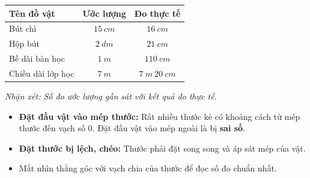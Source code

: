 \documentclass[10pt,a4paper]{article}
\begin{document}
\vspace{-1.5mm}
\noindent
\begin{minipage}[t]{0.49\textwidth}\vspace{0pt}
\begin{tcolorbox}[
  enhanced,
  colback=green!4!white,
  colframe=green!60!black,
  arc=2mm, boxrule=0.8pt,
  left=2mm, right=2mm, top=1.8mm, bottom=1.8mm,
  title={\footnotesize\bfseries\color{white}\faCheckCircle\ 4. Bảng ghi chép thực hành mẫu}
]
{\footnotesize
\begin{tabular}{|l|c|c|}
  \hline
  \textbf{Tên đồ vật} & \textbf{Ước lượng} & \textbf{Đo thực tế} \\
  \hline
  Bút chì & $15\ cm$ & $16\ cm$ \\
  Hộp bút & $2\ dm$ & $21\ cm$ \\
  Bề dài bàn học & $1\ m$ & $110\ cm$ \\
  Chiều dài lớp học & $7\ m$ & $7\ m\ 20\ cm$ \\
  \hline
\end{tabular}
\vspace{1mm}
\textit{Nhận xét: Số đo ước lượng gần sát với kết quả đo thực tế.}
}
\end{tcolorbox}
\end{minipage}
\hfill
\begin{minipage}[t]{0.49\textwidth}\vspace{0pt}
\begin{tcolorbox}[
  enhanced,
  colback=rose!4!white,
  colframe=rose!70!black,
  arc=2mm, boxrule=0.8pt,
  left=2mm, right=2mm, top=1.8mm, bottom=1.8mm,
  title={\footnotesize\bfseries\color{white}\faExclamationTriangle\ 5. Lỗi đo lường thường gặp}
]
{\footnotesize
\begin{itemize}\setlength{\itemsep}{1.5pt}\setlength{\leftskip}{-2.5mm}
  \item \textbf{Đặt đầu vật vào mép thước:} Rất nhiều thước kẻ có khoảng cách từ mép thước đến vạch số $0$. Đặt đầu vật vào mép ngoài là bị \textbf{sai số}.
  \item \textbf{Đặt thước bị lệch, chéo:} Thước phải đặt song song và áp sát mép của vật.
  \item Mắt nhìn thẳng góc với vạch chia của thước để đọc số đo chuẩn nhất.
\end{itemize}
}
\end{tcolorbox}
\end{minipage}
\end{document}
